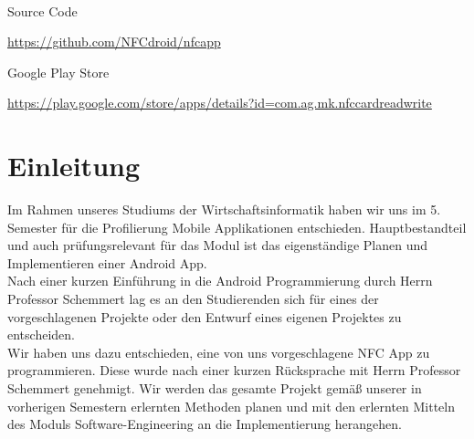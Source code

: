 \documentclass[a4paper,ngerman,12pt]{scrreprt}
\newcommand{\+}{\discretionary{\mbox{\scriptsize$\hookleftarrow$}}{}{}}
\begin{document}
\begin{titlepage}
\begin{center}
		\\[2cm]
		\begin{minipage}{0.2\textwidth}
			\begin{flushleft}
				{\footnotesize Source Code}
			\end{flushleft}
		\end{minipage}
		\hfill
		\begin{minipage}{0.75\textwidth}
			\begin{flushleft}
				{\normalsize
				\url{https://github.com/NFCdroid/nfcapp}
				}
			\end{flushleft}
		\end{minipage}
		\begin{minipage}{0.2\textwidth}
			\begin{flushleft}
				{\footnotesize Google Play Store}
			\end{flushleft}
		\end{minipage}
		\hfill
		\begin{minipage}{0.75\textwidth}
			\begin{flushleft}
				{\normalsize
					\url{https://play.google.com/store/apps/details?id=com.ag.mk.nfccardreadwrite}
				}
			\end{flushleft}
		\end{minipage}
		\vfill
	\end{center}
\end{titlepage}

\begingroup
\renewcommand*{\chapterpagestyle}{empty}
\pagestyle{empty}
\tableofcontents
\clearpage
\endgroup

\chapter{Einleitung}
 Im Rahmen unseres Studiums der Wirtschaftsinformatik haben wir uns im 5. Semester für die Profilierung Mobile Applikationen entschieden. Hauptbestandteil und auch prüfungsrelevant für das Modul ist das eigenständige Planen und Implementieren einer Android App. \\
 Nach einer kurzen Einführung in die Android Programmierung durch Herrn Professor Schemmert lag es an den Studierenden sich für eines der vorgeschlagenen Projekte oder den Entwurf eines eigenen Projektes zu entscheiden. \\
 Wir haben uns dazu entschieden, eine von uns vorgeschlagene \ac{NFC} App zu programmieren. Diese wurde nach einer kurzen Rücksprache mit Herrn Professor Schemmert genehmigt. \newline
 Wir werden das gesamte Projekt gemäß unserer in vorherigen Semestern erlernten Methoden planen und mit den erlernten Mitteln des Moduls Software-\/\+Engineering an die Implementierung herangehen.
\end{document}
